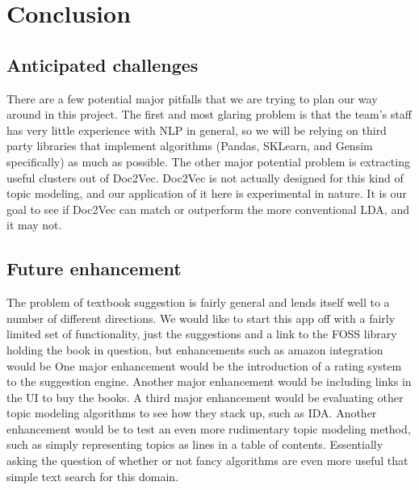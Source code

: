
\section{Conclusion}
\subsection{Anticipated challenges}
There are a few potential major pitfalls that we are trying to plan our way around in this project.  
The first and most glaring problem is that the team's staff has very little experience with NLP in general, so we will be relying on third party libraries that implement algorithms (Pandas, SKLearn, and Gensim specifically) as much as possible.
The other major potential problem is extracting useful clusters out of Doc2Vec.  
Doc2Vec is not actually designed for this kind of topic modeling, and our application of it here is experimental in nature. 
It is our goal to see if Doc2Vec can match or outperform the more conventional LDA, and it may not.  

\subsection{Future enhancement}
The problem of textbook suggestion is fairly general and lends itself well to a number of different directions.
We would like to start this app off with a fairly limited set of functionality, just the suggestions and a link to the FOSS library holding the book in question, but enhancements such as amazon integration would be 
One major enhancement would be the introduction of a rating system to the suggestion engine.  
Another major enhancement would be including links in the UI to buy the books.
A third major enhancement would be evaluating other topic modeling algorithms to see how they stack up, such as IDA.
Another enhancement would be to test an even more rudimentary topic modeling method, such as simply representing topics as lines in a table of contents.  
Essentially asking the question of whether or not fancy algorithms are even more useful that simple text search for this domain.